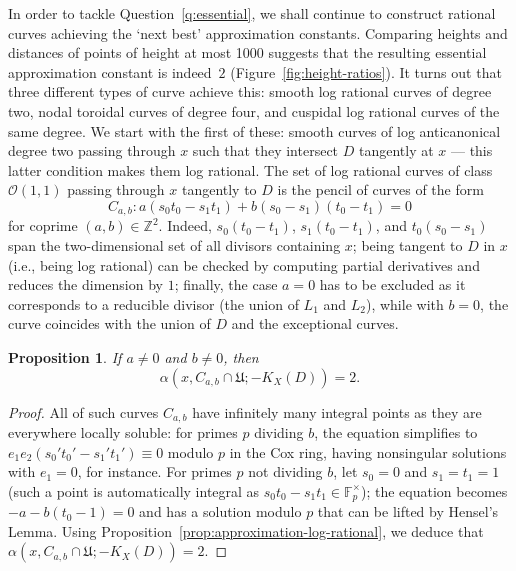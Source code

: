 \documentclass[a4paper, twoside, 11pt]{amsart}
\newtheorem{proposition}[theorem]{Proposition}
\theoremstyle{definition}
\newcommand{\CO}{{\mathcal{O}}}
\newcommand{\mU}{\mathfrak{U}}
\newcommand{\FF}{\mathbb{F}}
\newcommand{\ZZ}{\mathbb{Z}}
\begin{document}
In order to tackle Question~\ref{q:essential}, we shall continue to construct rational curves achieving the `next best' approximation constants. Comparing heights and distances of points of height at most 1000 suggests that the resulting essential approximation constant is indeed~$2$ (Figure~\ref{fig:height-ratios}).
It turns out that three different types of curve achieve this: smooth log rational curves of degree two, nodal toroidal curves of degree four, and cuspidal log rational curves of the same degree.
We start with the first of these: smooth curves of log anticanonical degree two passing through $x$ such that they intersect $D$ tangently at $x$ --- this latter condition makes them log rational. The set of log rational curves of class $\CO(1,1)$ passing through $x$ tangently to $D$ is the pencil of curves of the form 
\[
	C_{a,b}\colon a (s_0t_0 -s_1t_1) +b(s_0-s_1)(t_0-t_1) = 0
\]
for coprime $(a,b) \in \ZZ^2$. Indeed, $s_0(t_0-t_1)$, $s_1(t_0-t_1)$, and $t_0(s_0-s_1)$ span the two-dimensional set of all divisors containing $x$; being tangent to $D$ in $x$ (i.e., being log rational) can be checked by computing partial derivatives and reduces the dimension by $1$; finally, the case $a=0$ has to be excluded as it corresponds to a reducible divisor (the union of $L_1$ and $L_2$), while with $b=0$, the curve coincides with the union of $D$ and the exceptional curves.
\begin{proposition}\label{prop:cab}
    If $a\ne 0$ and $b\ne 0$, then
	\begin{equation*}
		\alpha(x,C_{a,b}\cap \mU;-K_X(D))=2.
	\end{equation*}
\end{proposition}
\begin{proof} 
All of such curves $C_{a,b}$ have infinitely many integral points as they are everywhere locally soluble: for primes $p$ dividing $b$, the equation simplifies to $e_1e_2(s_0't_0'-s_1't_1')\equiv 0$ modulo $p$ in the Cox ring, having nonsingular solutions with $e_1=0$, for instance. For primes $p$ not dividing $b$, let $s_0=0$ and $s_1=t_1=1$ (such a point is automatically integral as $s_0t_0-s_1t_1\in \FF_p^\times$); the equation becomes $-a-b(t_0-1)=0$ and has a solution modulo $p$ that can be lifted by Hensel's Lemma.
Using Proposition~\ref{prop:approximation-log-rational}, we deduce that $\alpha(x,C_{a,b}\cap \mU;-K_X(D))=2$.
\end{proof}
\end{document}
